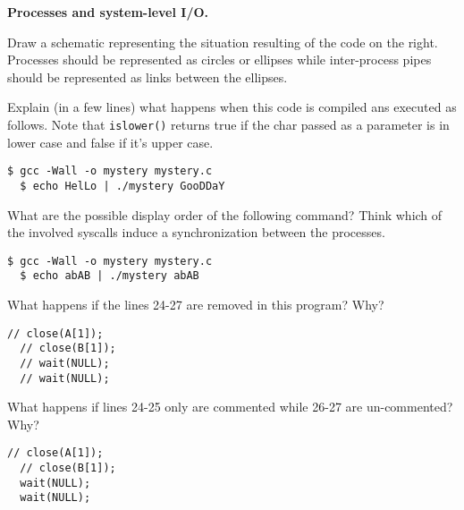 \documentclass[10pt]{article}\usepackage[enonce]{exemptty}
\newenvironment{Live}%
    {\color{RoyalPurple}}%
    {\color{black}}
\begin{document}
\bigskip
\noindent
\begin{minipage}[t]{.5\linewidth}
  \Exercise \textbf{Processes and system-level I/O.}

  \Question Draw a schematic representing the situation resulting of the code on
  the right. Processes should be represented as circles or ellipses while
  inter-process pipes should be represented as links between the ellipses.

  \Question Explain (in a few lines) what happens when this code is compiled ans
  executed as follows. Note that \texttt{islower()} returns true if the char
  passed as a parameter is in lower case and false if it's upper case.
\begin{Verbatim}[gobble=2,numbers=none]
  $ gcc -Wall -o mystery mystery.c
  $ echo HelLo | ./mystery GooDDaY
\end{Verbatim}

\Question What are the possible display order of the following command? Think
which of the involved syscalls induce a synchronization between the processes.
\begin{Verbatim}[gobble=2,numbers=none]
  $ gcc -Wall -o mystery mystery.c
  $ echo abAB | ./mystery abAB
\end{Verbatim}

\Question What happens if the lines 24-27 are removed in this program? Why?
\begin{Verbatim}[gobble=2,firstnumber=24]
  // close(A[1]); 
  // close(B[1]);
  // wait(NULL);
  // wait(NULL);
\end{Verbatim}

\begin{Live}
  \Question What happens if lines 24-25 only are commented while 26-27 are
  un-commented? Why?
\begin{Verbatim}[gobble=2,firstnumber=24]
  // close(A[1]); 
  // close(B[1]);
  wait(NULL);
  wait(NULL);
\end{Verbatim}
\end{Live}

\end{minipage}\hfill\begin{minipage}[t]{.4\linewidth}
\end{minipage}
\end{document}
